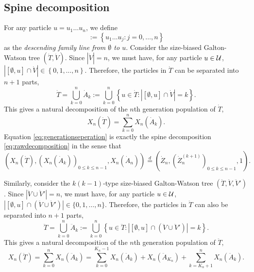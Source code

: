 \documentclass[12pt]{amsart}
\numberwithin{equation}{section}
\newcommand{\defn}[1]{{\em #1}}
\newcommand{\abs}[1]{\left| #1 \right|}
\newcommand{\expr}[1]{\left( #1 \right)}
\newcommand{\set}[1]{\left\{ #1 \right\}}
\newcommand{\ancestor}[1]{[\emptyset,#1]}
\newcommand{\eqlaw}{\overset{d}{=}}
\begin{document}
\subsection{Spine decomposition}
\label{sec:spinesdecomposition}
	For any particle $u=u_1\dots u_n$, we define
\begin{equation*}
	    \ancestor{u}
	:=
	    	    \set{u_1\dots u_j:j=0,\dots, n}
\end{equation*}
	as the \defn{descending family line from $\emptyset$ to $u$}.
	Consider the size-biased Galton-Watson tree $(\dot T,\dot V)$.
	Since $|\dot V|=n$, we must have, for any particle $u\in\mathcal U$, %
	$|\ancestor{u}\cap\dot V|\in\set{0,1,\dots,n}$.
	Therefore, the particles in $\dot T$ can be separated into $n+1$ parts,
\begin{equation*}
		\dot T
	=
		\bigcup_{k=0}^n\dot A_k
	:=
	    	    \bigcup_{k=0}^n\set{u\in\dot T:\abs{\ancestor{u}\cap \dot V}=k}.
\end{equation*}
	This gives a natural decomposition of the $n$th generation population of $\dot T$,
\begin{equation}
\label{eq:generationseperation}
		X_n(\dot T)
	=
		\sum_{k=0}^nX_n(\dot A_k).
\end{equation}
	Equation \eqref{eq:generationseperation} is exactly the spine decomposition \eqref{eq:rawdecomposition} in the sense that
\begin{equation*}
                \expr{X_n(\dot T),(X_n(\dot A_k))_{0\le k\le n-1},X_n(\dot A_n)}
    \eqlaw
               \expr{\dot Z_n,(\dot Z_n^{(k+1)})_{0\le k\le n-1},1}.
\end{equation*}
\par
	Similarly, consider the $k(k-1)$-type size-biased Galton-Watson tree $(\ddot T,\ddot V,\ddot V')$.
	Since $|\ddot V\cup\ddot V'|=n$, we must have, for any particle $u\in\mathcal U$, $|\ancestor{u}\cap(\ddot V\cup \ddot V')|\in\{0,1,\dots,n\}$.
	Therefore, the particles in $\ddot T$ can also be separated into $n+1$ parts,
\begin{equation*}
		\ddot T
	=
		\bigcup_{k=0}^n \ddot A_k
	:=
		\bigcup_{k=0}^n\set{u\in\ddot T: \abs{\ancestor{u}\cap(\ddot V\cup\ddot V')}=k}.
\end{equation*}
	This gives a natural decomposition of the $n$th generation population of $\ddot T$,
\begin{equation}
\label{eq:rawtwospinedecomposition}
		X_n(\ddot T)
	=
		\sum_{k=0}^nX_n(\ddot A_k)
	=
	    \sum_{k=0}^{K_n-1}X_n(\ddot A_k)
	+
		X_n(\ddot A_{K_n})
	+
		\sum_{k=K_n+1}^nX_n(\ddot A_k).
\end{equation}
\end{document}
